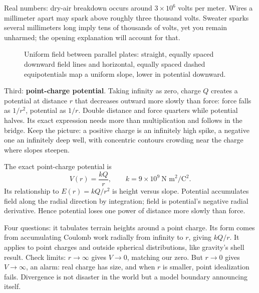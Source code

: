 \begin{mainline}
Real numbers: dry-air breakdown occurs around \(3\times10^{6}\) volts per meter. Wires a millimeter apart may spark above roughly three thousand volts. Sweater sparks several millimeters long imply tens of thousands of volts, yet you remain unharmed; the opening explanation will account for that.
\end{mainline}

\begin{figure}[htbp]
\centering
{}
\caption{Uniform field between parallel plates: straight, equally spaced downward field lines and horizontal, equally spaced dashed equipotentials map a uniform slope, lower in potential downward.}
\end{figure}

\begin{mainline}
Third: \textbf{point-charge potential}. Taking infinity as zero, charge \(Q\) creates a potential at distance \(r\) that decreases outward more slowly than force: force falls as \(1/r^2\), potential as \(1/r\). Double distance and force quarters while potential halves. Its exact expression needs more than multiplication and follows in the bridge. Keep the picture: a positive charge is an infinitely high spike, a negative one an infinitely deep well, with concentric contours crowding near the charge where slopes steepen.
\end{mainline}

\begin{mathbridge}
The exact point-charge potential is
\[
V(r) = \frac{kQ}{r},\qquad k = 9\times10^{9}\ \text{N m}^2/\text{C}^2 .
\]
Its relationship to \(E(r) = kQ/r^2\) is height versus slope. Potential accumulates field along the radial direction by integration; field is potential's negative radial derivative. Hence potential loses one power of distance more slowly than force.

Four questions: it tabulates terrain heights around a point charge. Its form comes from accumulating Coulomb work radially from infinity to \(r\), giving \(kQ/r\). It applies to point charges and outside spherical distributions, like gravity's shell result. Check limits: \(r\to\infty\) gives \(V\to 0\), matching our zero. But \(r\to 0\) gives \(V\to\infty\), an alarm: real charge has size, and when \(r\) is smaller, point idealization fails. Divergence is not disaster in the world but a model boundary announcing itself.
\end{mathbridge}

